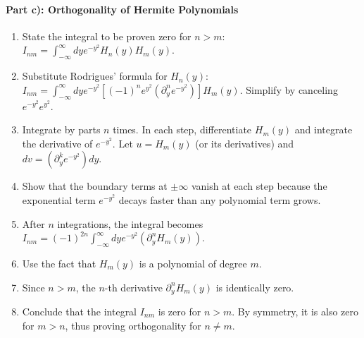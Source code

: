 \documentclass[10pt]{article}
\begin{document}
\paragraph{Part c): Orthogonality of Hermite Polynomials}
\begin{enumerate}
    \item State the integral to be proven zero for \(n > m\): \( I_{nm} = \int_{-\infty}^{\infty} dy e^{-y^{2}} H_{n}(y) H_{m}(y) \).
    \item Substitute Rodrigues' formula for \(H_n(y)\): \( I_{nm} = \int_{-\infty}^{\infty} dy e^{-y^2} [(-1)^n e^{y^2} (\partial_y^n e^{-y^2})] H_m(y) \). Simplify by canceling \(e^{-y^2}e^{y^2}\).
    \item Integrate by parts \(n\) times. In each step, differentiate \(H_m(y)\) and integrate the derivative of \(e^{-y^2}\). Let \(u = H_m(y)\) (or its derivatives) and \(dv = (\partial_y^k e^{-y^2}) dy\).
    \item Show that the boundary terms at \(\pm\infty\) vanish at each step because the exponential term \(e^{-y^2}\) decays faster than any polynomial term grows.
    \item After \(n\) integrations, the integral becomes \( I_{nm} = (-1)^{2n} \int_{-\infty}^{\infty} dy e^{-y^2} (\partial_y^n H_m(y)) \).
    \item Use the fact that \(H_m(y)\) is a polynomial of degree \(m\).
    \item Since \(n > m\), the \(n\)-th derivative \(\partial_y^n H_m(y)\) is identically zero.
    \item Conclude that the integral \(I_{nm}\) is zero for \(n > m\). By symmetry, it is also zero for \(m > n\), thus proving orthogonality for \(n \neq m\).
\end{enumerate}
\end{document}
